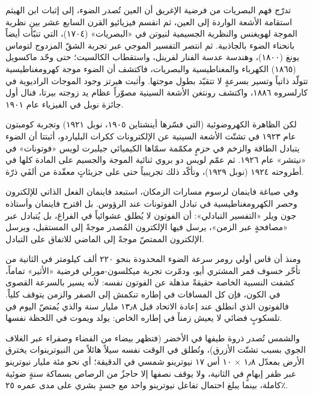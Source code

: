 \documentclass[12pt,a4paper,openany]{book}
\begin{document}



تدرّج فهم البصريات من فرضية الإغريق أن العين تُصدر الضوء، إلى إثبات ابن الهيثم استقامة الأشعة الواردة إلى العين، ثم انقسم فيزيائيو القرن السابع عشر بين نظرية الموجة لهويغنس والنظرية الجسيمية لنيوتن في «البصريات» (١٧٠٤)، التي تنبّأت أيضاً بانحناء الضوء بالجاذبية. ثم انتصر التفسير الموجي عبر تجربة الشقّ المزدوج لتوماس يونغ (١٨٠٠)، وهندسة عدسة الفنار لفرينل، واستقطاب الكالسيت؛ حتى وحّد ماكسويل (١٨٦٥) الكهرباء والمغناطيسية والبصريات، فاكتشف أن الضوء موجة كهرومغناطيسية تتولّد ذاتياً وتسير بسرعةٍ لا تتقيّد بطول موجتها. وأثبت هيرتز وجود الموجات الراديوية في كارلسروه ١٨٨٦، واكتشف رونتغن الأشعة السينية مصوّراً عظام يد زوجته بيرتا، فنال أول جائزة نوبل في الفيزياء عام ١٩٠١.


لكن الظاهرة الكهروضوئية (التي فسّرها أينشتاين ١٩٠٥، نوبل ١٩٢١) وتجربة كومبتون عام ١٩٢٣ في تشتّت الأشعة السينية عن الإلكترونات ككرات البلياردو، أثبتتا أن الضوء يتبادل الطاقة والزخم في حزمٍ مكمّمة سمّاها الكيميائي جيلبرت لويس «فوتونات» في «نيتشر» عام ١٩٢٦. ثم عمّم لويس دو بروي ثنائية الموجة والجسيم على المادة كلها في أطروحته ١٩٢٤ (نوبل ١٩٢٩)، وتأكّد ذلك تجريبياً حتى على جزيئاتٍ معقّدة من ألفَي ذرّة.


وفي صياغة فاينمان لرسوم مسارات الزمكان، استبعد فاينمان الفعل الذاتي للإلكترون وحصر الكهرومغناطيسية في تبادل الفوتونات عند الرؤوس. بل اقترح فاينمان وأستاذه جون ويلر «التفسير التبادلي»: أن الفوتون لا يُطلق عشوائياً في الفراغ، بل يُتبادل عبر «مصافحةٍ عبر الزمن»، يرسل فيها الإلكترون المُصدر موجةً إلى المستقبل، ويرسل الإلكترون الممتصّ موجةً إلى الماضي للاتفاق على التبادل.


ومنذ أن قاس أولي رومر سرعة الضوء المحدودة بنحو ٢٢٠ ألف كيلومتر في الثانية من تأخّر خسوف قمر المشتري أيو، ودمّرت تجربة ميكلسون-مورلي فرضية «الأثير» تماماً، كشفت النسبية الخاصة حقيقةً مذهلة عن الفوتون نفسه: لأنه يسير بالسرعة القصوى في الكون، فإن كل المسافات في إطاره تنكمش إلى الصفر والزمن يتوقف كلياً. فالفوتون الذي انطلق عند إعادة الاتحاد قبل ١٣٫٨ مليار سنة والذي يُمتصّ اليوم في تلسكوبٍ فضائي لا يعيش زمناً في إطاره الخاص: يولد ويموت في اللحظة نفسها.


والشمس تُصدر ذروة طيفها في الأخضر (فتظهر بيضاء من الفضاء وصفراء عبر الغلاف الجوي بسبب تشتّت الأزرق)، وتُطلق في الوقت نفسه سيلاً هائلاً من النيوترينوات يخترق الأرض بمعدّل ١٫٨ × ١٠ أس ١٧ نيوترينو شمسي في الدقيقة؛ أي نحو مئة مليار نيوترينو عبر ظفر إبهامٍ في الثانية، ولا يوقف نصفها إلا حاجزٌ من الرصاص بسماكة سنةٍ ضوئية كاملة، بينما يبلغ احتمال تفاعل نيوترينو واحد مع جسدٍ بشري على مدى عمره ٢٥٪.
\end{document}
